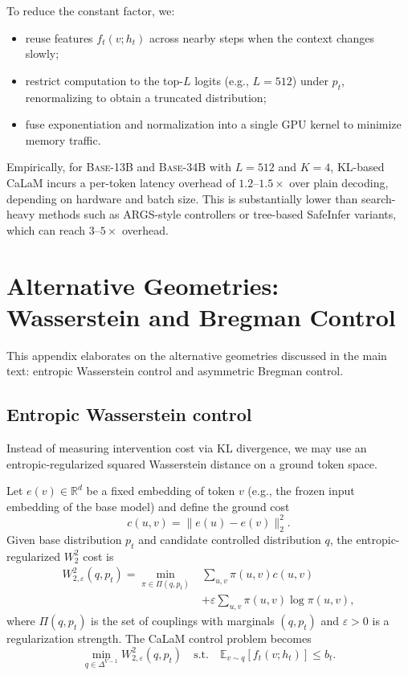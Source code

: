 \documentclass{article}
\theoremstyle{plain}
\theoremstyle{definition}
\theoremstyle{remark}
\begin{document}
To reduce the constant factor, we:

\begin{itemize}[leftmargin=1.5em]
  \item reuse features $f_t(v;h_t)$ across nearby steps when the context changes slowly;
  \item restrict computation to the top-$L$ logits (e.g., $L=512$) under $p_t$, renormalizing to obtain a truncated distribution;
  \item fuse exponentiation and normalization into a single GPU kernel to minimize memory traffic.
\end{itemize}

Empirically, for \textsc{Base-13B} and \textsc{Base-34B} with $L=512$ and $K=4$, KL-based CaLaM incurs a per-token latency overhead of $1.2$--$1.5\times$ over plain decoding, depending on hardware and batch size.
This is substantially lower than search-heavy methods such as ARGS-style controllers or tree-based SafeInfer variants, which can reach $3$--$5\times$ overhead.

\section{Alternative Geometries: Wasserstein and Bregman Control}
\label{app:alt-geom}

This appendix elaborates on the alternative geometries discussed in the main text: entropic Wasserstein control and asymmetric Bregman control.

\subsection{Entropic Wasserstein control}
\label{app:wasserstein}

Instead of measuring intervention cost via KL divergence, we may use an entropic-regularized squared Wasserstein distance on a ground token space.

Let $e(v) \in \mathbb{R}^d$ be a fixed embedding of token $v$ (e.g., the frozen input embedding of the base model) and define the ground cost
\begin{equation}
  c(u,v) = \|e(u) - e(v)\|_2^2.
\end{equation}
Given base distribution $p_t$ and candidate controlled distribution $q$, the entropic-regularized $W_2^2$ cost is
\begin{equation}
\begin{split}
  W_{2,\varepsilon}^2(q,p_t) = \min_{\pi \in \Pi(q,p_t)} 
  & \sum_{u,v} \pi(u,v) c(u,v) \\
  & + \varepsilon \sum_{u,v} \pi(u,v)\log \pi(u,v),
\end{split}
\end{equation}
where $\Pi(q,p_t)$ is the set of couplings with marginals $(q,p_t)$ and $\varepsilon>0$ is a regularization strength.
The CaLaM control problem becomes
\begin{equation}
  \min_{q \in \Delta^{V-1}}
  W_{2,\varepsilon}^2(q,p_t)
  \quad\text{s.t.}\quad
  \mathbb{E}_{v \sim q}[f_t(v;h_t)] \le b_t.
\end{equation}
\end{document}
